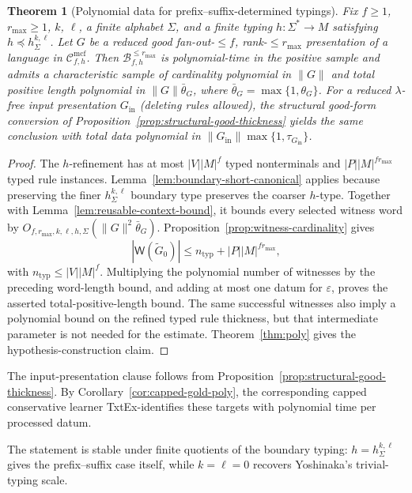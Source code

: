 \documentclass[11pt]{article}
\numberwithin{equation}{section}
\theoremstyle{plain}
\newtheorem{theorem}{Theorem}[section]
\theoremstyle{definition}
\theoremstyle{remark}
\newcommand{\Wit}{\mathsf{W}}
\newcommand{\Cmcf}[2]{\mathcal{C}^{\mathrm{mcf}}_{#1,#2}}
\newcommand{\eps}{\varepsilon}
\begin{document}
\begin{theorem}[Polynomial data for prefix--suffix-determined typings]
\label{thm:boundary-polydata}
Fix $f\ge1$, $r_{\max}\ge1$, $k$, $\ell$, a finite alphabet $\Sigma$, and a
finite typing $h:\Sigma^*\to M$ satisfying
$h\preceq h_\Sigma^{k,\ell}$.  Let $G$ be a reduced good fan-out-$\le f$,
rank-$\le r_{\max}$ presentation of a language in $\Cmcf{f}{h}$.  Then
$\mathcal B_{f,h}^{\le r_{\max}}$ is polynomial-time in the positive sample
and admits a characteristic sample of cardinality polynomial in $\|G\|$ and
total positive length polynomial in $\|G\|\bar\theta_G$, where
$\bar\theta_G=\max\{1,\theta_G\}$.  For a reduced $\lambda$-free input
presentation $G_{\mathrm{in}}$ (deleting rules allowed), the structural
good-form conversion of Proposition~\ref{prop:structural-good-thickness}
yields the same conclusion with total data polynomial in
$\|G_{\mathrm{in}}\|\max\{1,\tau_{G_{\mathrm{in}}}\}$.
\end{theorem}

\begin{proof}
The $h$-refinement has at most $|V||M|^f$ typed nonterminals and
$|P||M|^{fr_{\max}}$ typed rule instances.
Lemma~\ref{lem:boundary-short-canonical} applies because preserving the finer
$h_\Sigma^{k,\ell}$ boundary type preserves the coarser $h$-type.  Together
with Lemma~\ref{lem:reusable-context-bound}, it bounds every selected witness
word by
$O_{f,r_{\max},k,\ell,h,\Sigma}(\|G\|^2\bar\theta_G)$.
Proposition~\ref{prop:witness-cardinality} gives
\[
 |\Wit(\widetilde G_0)|
 \le n_{\mathrm{typ}}+|P||M|^{f r_{\max}},
\]
with $n_{\mathrm{typ}}\le |V||M|^f$.  Multiplying the polynomial number of
witnesses by the preceding word-length bound, and adding at most one datum for
$\eps$, proves the asserted total-positive-length bound.  The same successful
witnesses also imply a polynomial bound on the refined typed rule thickness,
but that intermediate parameter is not needed for the estimate.  Theorem~\ref{thm:poly} gives the hypothesis-construction claim.
\end{proof}

The input-presentation clause follows from
Proposition~\ref{prop:structural-good-thickness}.  By
Corollary~\ref{cor:capped-gold-poly}, the corresponding capped conservative
learner TxtEx-identifies these targets with polynomial time per processed
datum.

The statement is stable under finite quotients of the boundary typing:
$h=h_\Sigma^{k,\ell}$ gives the prefix--suffix case itself, while
$k=\ell=0$ recovers Yoshinaka's trivial-typing scale.
\end{document}
